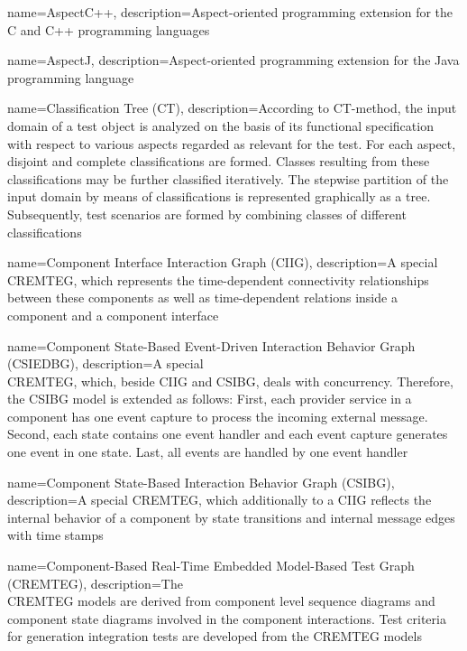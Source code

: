 {
	name={AspectC++},
	description={Aspect-oriented programming extension for the C and C++ programming languages \cite{C++}}
}

{
	name={AspectJ},
	description={Aspect-oriented programming extension for the Java programming language \cite{J}}
}

{
	name={Classification Tree (CT)},
	description={According to CT-method, the input domain of a test object is analyzed on the basis of its functional specification with respect to various aspects regarded as relevant for the test. For each aspect, disjoint and complete classifications are formed. Classes resulting from these classifications may be further classified iteratively. The stepwise partition of the input domain by means of classifications is represented graphically as a tree. Subsequently, test scenarios are formed by combining classes of different classifications \cite{Conrad2005}}
}

{
	name={Component Interface Interaction Graph (CIIG)},
	description={A special CREMTEG, which represents the time-dependent connectivity relationships between these components as well as time-dependent relations inside a component and a component interface \cite{Guan2015}}
}

{
	name={Component State-Based Event-Driven Interaction Behavior Graph (CSIEDBG)},
	description={A special \\CREMTEG, which, beside CIIG and CSIBG, deals with concurrency. Therefore, the CSIBG model is extended as follows: First, each provider service in a component has one event capture to process the incoming external message. Second, each state contains one event handler and each event capture generates one event in one state. Last, all events are handled by one event handler \cite{Guan2015}}
}

{
	name={Component State-Based Interaction Behavior Graph (CSIBG)},
	description={A special CREMTEG, which additionally to a CIIG reflects the internal behavior of a component by state transitions and internal message edges with time stamps \cite{Guan2015}}
}

{
	name={Component-Based Real-Time Embedded Model-Based Test Graph (CREMTEG)},
	description={The \\CREMTEG models are derived from component level sequence diagrams and component state diagrams involved in the component interactions. Test criteria for generation integration tests are developed from the CREMTEG models \cite{Guan2015}}
}

